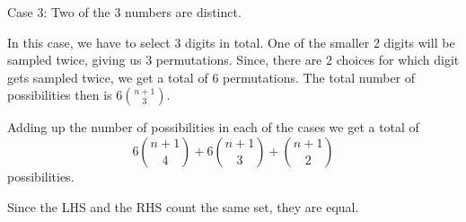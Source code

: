 \begin{enumerate}[label=(\alph*)]
  Case 3: Two of the $3$ numbers are distinct.
  
  In this case, we have to select $3$ digits in total. One of the smaller $2$ 
  digits will be sampled twice, giving us $3$ permutations. Since, there are $2$ 
  choices for which digit gets sampled twice, we get a total of $6$ permutations. 
  The total number of possibilities then is $6{n+1 \choose 3}$.
  
  Adding up the number of possibilities in each of the cases we get a total of 
  $$6{n+1 \choose 4} + 6{n+1 \choose 3} + {n+1 \choose 2}$$ possibilities. 
  
  Since the LHS and the RHS count the same set, they are equal.

\end{enumerate}